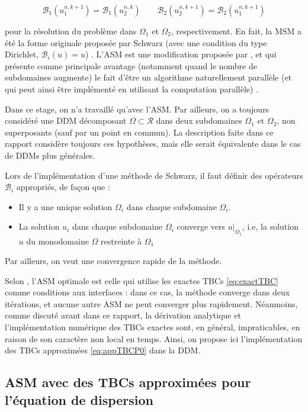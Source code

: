 $$\mathcal{B}_1(u_1^{n,k+1}) = \mathcal{B}_1(u_2^{n,k}) \qquad \mathcal{B}_2(u_2^{n,k+1}) = \mathcal{B}_2(u_1^{n,k+1})$$

\noindent pour la résolution du problème dans $\Omega_1$ et $\Omega_2$, respectivement. En fait, la MSM a été la forme originale proposée par Schwarz (avec une condition du type Dirichlet, $\mathcal{B}_i(u) = u$)  \cite{Japhet2003,Lions1990}. L'ASM est une modification proposée par \cite{Lions1988}, et qui présente comme principale avantage (notamment quand le nombre de subdomaines augmente) le fait d'être un algorithme naturellement parallèle (et qui peut ainsi être implémenté en utilisant la computation parallèle) \cite{Lions1988}.

\indent Dans ce stage, on n'a travaillé qu'avec l'ASM. Par ailleurs, on a toujours considéré une DDM décomposant $\Omega \subset \mathcal{R}$ dans deux subdomaines $\Omega_1$ et $\Omega_2$, non superposants (sauf par un point en commun). La description faite dans ce rapport considère toujours ces hypothèses, mais elle serait équivalente dans le cas de DDMs plus générales.

\indent Lors de l'implémentation d'une méthode de Schwarz, il faut définir des opérateurs $\mathcal{B}_i$ appropriés, de façon que :

\begin{itemize}
   	\item Il y a une unique solution $\Omega_i$ dans chaque subdomaine $\Omega_i$.
	\item La solution $u_i$ dans chaque subdomaine $\Omega_i$ converge vers $u|_{\Omega_1}$, i.e, la solution $u$ du monodomaine $\Omega$ restreinte à $\Omega_1$
\end{itemize}

\indent Par ailleurs, on veut une convergence rapide de la méthode.

\indent Selon \cite{Japhet2003}, l'ASM optimale est celle qui utilise les exactes TBCs \eqref{eq:exactTBC} comme conditions aux interfaces : dans ce cas, la méthode converge dans deux itérations, et aucune autre ASM ne peut converger plus rapidement. Néanmoins, comme discuté avant dans ce rapport, la dérivation analytique et l'implémentation numérique des TBCs exactes sont, en général, impraticables, en raison de son caractère non local en temps. Ainsi, on propose ici l'implémentation des TBCs approximées \eqref{eq:appTBCP0} dans la DDM.

\subsection{ASM avec des TBCs approximées pour l'équation de dispersion}

